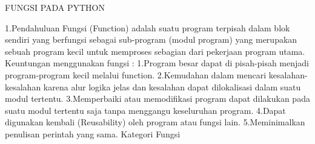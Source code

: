 FUNGSI PADA PYTHON

1.Pendahuluan  
 Fungsi (Function) adalah suatu program terpisah dalam blok sendiri yang berfungsi sebagai sub-program (modul program) yang merupakan sebuah program kecil untuk memproses sebagian dari pekerjaan program utama. 
 Keuntungan menggunakan fungsi : 
1.Program besar dapat di pisah-pisah menjadi program-program kecil melalui function. 
2.Kemudahan dalam mencari kesalahan-kesalahan karena alur logika jelas dan kesalahan dapat dilokalisasi dalam suatu modul tertentu. 
3.Memperbaiki atau memodifikasi program dapat dilakukan pada suatu modul tertentu saja tanpa menggangu keseluruhan program. 
4.Dapat digunakan kembali (Reusability) oleh program atau fungsi lain. 
5.Meminimalkan penulisan perintah yang sama.  
Kategori Fungsi 

